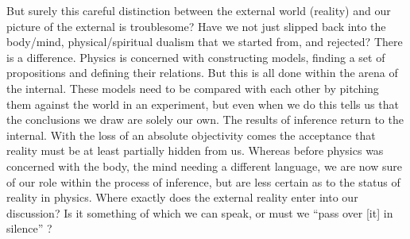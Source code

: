 
But surely this careful distinction between the external world
(reality) and our picture of the external is troublesome?
Have we not just slipped back into the body/mind, physical/spiritual
dualism that we started from, and rejected?
There is a difference.
Physics is  concerned with constructing models,
finding a set of propositions and defining their relations.
But this is all done within the arena of the internal.
These models need to be compared with each other by pitching
them against the world in an experiment, 
but even when we do this  tells us that the conclusions we draw are solely our own.
The results of  inference return to the internal.
With the loss of an absolute objectivity comes the acceptance that
reality must be at least partially hidden from us.
%
Whereas before physics was concerned with the body,
the mind needing a different language,
we are now sure of our role within the process of inference,
but are less certain as to the status of reality in physics.
Where exactly does the external reality enter into our discussion?
Is it something of which we can speak, 
or must we ``pass over [it] in silence'' \cite[7]{WittgensteinBook}?


